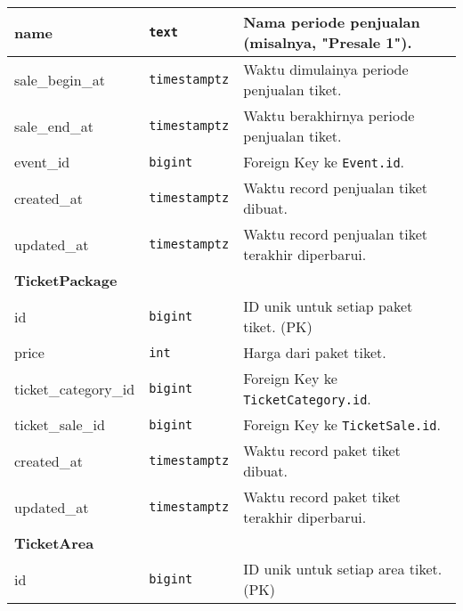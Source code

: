 \begin{longtable}{|l|p{}|p{}|}
	\hline
	name                 & \texttt{text}         & Nama periode penjualan (misalnya, "Presale 1").                                      \\
	\hline
	sale\_begin\_at      & \texttt{timestamptz}  & Waktu dimulainya periode penjualan tiket.                                            \\
	\hline
	sale\_end\_at        & \texttt{timestamptz}  & Waktu berakhirnya periode penjualan tiket.                                           \\
	\hline
	event\_id            & \texttt{bigint}       & Foreign Key ke \texttt{Event.id}.                                                    \\
	\hline
	created\_at          & \texttt{timestamptz}  & Waktu record penjualan tiket dibuat.                                                 \\
	\hline
	updated\_at          & \texttt{timestamptz}  & Waktu record penjualan tiket terakhir diperbarui.                                    \\
	\hline
	\multicolumn{3}{|l|}{\textbf{TicketPackage}}                                                                                        \\
	\hline
	id                   & \texttt{bigint}       & ID unik untuk setiap paket tiket. (PK)                                               \\
	\hline
	price                & \texttt{int}          & Harga dari paket tiket.                                                              \\
	\hline
	ticket\_category\_id & \texttt{bigint}       & Foreign Key ke \texttt{TicketCategory.id}.                                           \\
	\hline
	ticket\_sale\_id     & \texttt{bigint}       & Foreign Key ke \texttt{TicketSale.id}.                                               \\
	\hline
	created\_at          & \texttt{timestamptz}  & Waktu record paket tiket dibuat.                                                     \\
	\hline
	updated\_at          & \texttt{timestamptz}  & Waktu record paket tiket terakhir diperbarui.                                        \\
	\hline
	\multicolumn{3}{|l|}{\textbf{TicketArea}}                                                                                           \\
	\hline
	id                   & \texttt{bigint}       & ID unik untuk setiap area tiket. (PK)                                                \\

\end{longtable}
